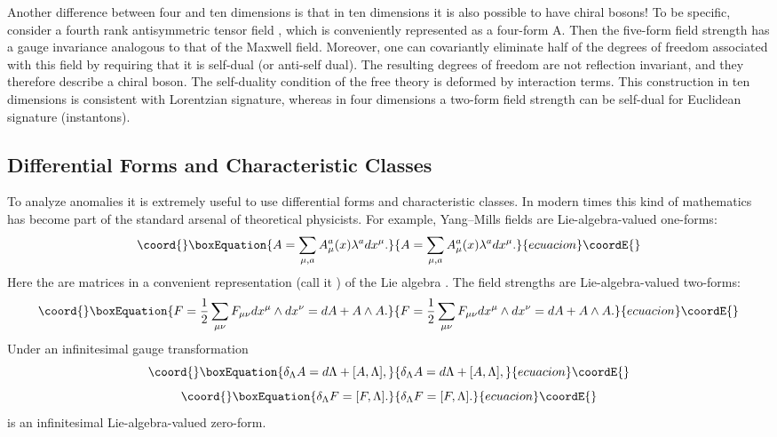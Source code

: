 \documentclass[a4paper,12pt]{article}
\begin{document}
Another difference between four and ten dimensions is that in ten
dimensions it is also possible to have chiral bosons! To be
specific, consider a fourth rank antisymmetric tensor field
\coordHE{} , which is conveniently represented as a
four-form A. Then the five-form field strength \coordHE{} has a gauge
invariance analogous to that of the Maxwell field.  Moreover, one
can covariantly eliminate half of the degrees of freedom
associated with this field by requiring that it is self-dual (or
anti-self dual). The resulting degrees of freedom are not
reflection invariant, and they therefore describe a chiral boson.
The self-duality condition of the free theory is deformed by interaction terms.
This construction in ten dimensions is consistent with Lorentzian
signature, whereas in four dimensions a two-form field strength
can be self-dual for Euclidean signature (instantons).

\subsection{Differential Forms and Characteristic Classes}
To analyze anomalies it is extremely useful to use differential
forms and characteristic classes. In modern times this kind of
mathematics has become part of the standard arsenal of theoretical
physicists.  For example, Yang--Mills fields are
Lie-algebra-valued one-forms:
\begin{equation}\coord{}\boxEquation{
A = \sum_{\mu, a} A^{a}_{\mu}(x) \lambda^{a} dx^{\mu}.
}{
A = \sum_{\mu, a} A^{a}_{\mu}(x) \lambda^{a} dx^{\mu}.
}{ecuacion}\coordE{}\end{equation}
Here the \coordHE{} are matrices in a convenient representation
(call it \myHighlight{$\rho$}\coordHE{}) of the Lie algebra \coordHE{}. The field
strengths are Lie-algebra-valued two-forms:
\begin{equation}\coord{}\boxEquation{
F = {1\over2} \sum_{\mu\nu} F_{\mu\nu} dx^{\mu} \wedge dx^{\nu} = dA + A\wedge A.
}{
F = {1\over2} \sum_{\mu\nu} F_{\mu\nu} dx^{\mu} \wedge dx^{\nu} = dA + A\wedge A.
}{ecuacion}\coordE{}\end{equation}
Under an infinitesimal gauge transformation
\begin{equation}\coord{}\boxEquation{
\delta_{\Lambda} A = d\Lambda + [A, \Lambda],
}{
\delta_{\Lambda} A = d\Lambda + [A, \Lambda],
}{ecuacion}\coordE{}\end{equation}
\begin{equation}\coord{}\boxEquation{
\delta_{\Lambda} F = [F, \Lambda].
}{
\delta_{\Lambda} F = [F, \Lambda].
}{ecuacion}\coordE{}\end{equation}
\myHighlight{$\Lambda$}\coordHE{} is an infinitesimal Lie-algebra-valued zero-form.
\end{document}
